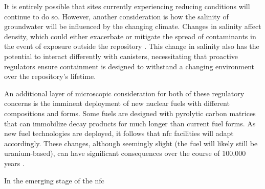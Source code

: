 It is entirely possible that sites currently experiencing reducing conditions will continue to do so. However, another consideration is how the salinity of groundwater will be influenced by the changing climate. Changes in salinity affect density, which could either exacerbate or mitigate the spread of contaminants in the event of exposure outside the repository \cite{gurban_hydrochemical_2001}. This change in salinity also has the potential to interact differently with canisters, necessitating that proactive regulators ensure containment is designed to withstand a changing environment over the repository's lifetime.

An additional layer of microscopic consideration for both of these regulatory concerns is the imminent deployment of new nuclear fuels with different compositions and forms. Some fuels are designed with pyrolytic carbon matrices that can immobilize decay products for much longer than current fuel forms. As new fuel technologies are deployed, it follows that \gls{nfc} facilities will adapt accordingly. These changes, although seemingly slight (the fuel will likely still be uranium-based), can have significant consequences over the course of 100,000 years \cite{hyland_post_closure_2013}.


In the emerging stage of the \gls{nfc}



